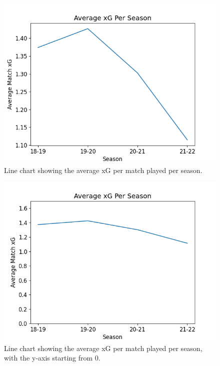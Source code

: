 \documentclass[12pt, a4paper, twocolumn]{article}
\begin{document}
\begin{figure}
  \includegraphics[width=\linewidth]{../vis/tables/average_xg_pergame.png}
  \caption{Line chart showing the average xG per match played per season.}
  \label{xg_pergame}
\end{figure}

\begin{figure}
  \includegraphics[width=\linewidth]{../vis/tables/average_xg_pergame_newaxis.png}
  \caption{Line chart showing the average xG per match played per season, with the y-axis starting from 0.}
  \label{xg_axis}
\end{figure}
\end{document}
